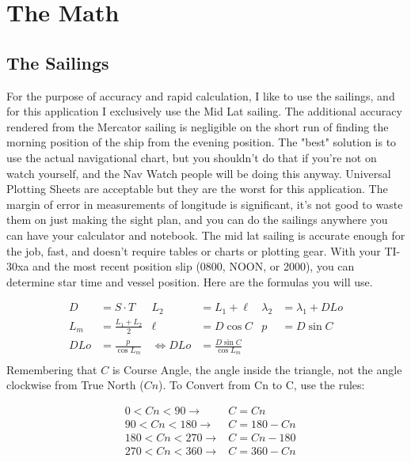 \documentclass{article}
\begin{document}
\section{The Math}\label{sec:examples}

\subsection{The Sailings}

For the purpose of accuracy and rapid calculation, I like to use the sailings, and for this application I exclusively use the Mid Lat sailing. The additional accuracy rendered from the Mercator sailing is negligible on the short run of finding the morning position of the ship from the evening position. The "best" solution is to use the actual navigational chart, but you shouldn't do that if you're not on watch yourself, and the Nav Watch people will be doing this anyway. Universal Plotting Sheets are acceptable but they are the worst for this application. The margin of error in measurements of longitude is significant, it's not good to waste them on just making the sight plan, and you can do the sailings anywhere you can have your calculator and notebook. The mid lat sailing is accurate enough for the job, fast, and doesn't require tables or charts or plotting gear. With your TI-30xa and the most recent position slip (0800, NOON, or 2000), you can determine star time and vessel position. Here are the formulas you will use.

\begin{align*}
    D&=S\cdot T   &   L_2&=L_1+\ell   &   \lambda_2&=\lambda_1+DLo\\
    L_m&=\frac{L_1+L_2}{2}  &   \ell&=D\cos{C}  &   p&=D\sin{C}\\
    DLo&=\frac{p}{\cos{L_m}}    &\Longleftrightarrow     DLo&=\frac{D\sin{C}}{\cos{L_m}}\\
\end{align*}
Remembering that $C$ is Course Angle, the angle inside the triangle, not the angle clockwise from True North ($Cn$). To Convert from Cn to C, use the rules:

\begin{align*}
    &0<Cn<90 \to &C=Cn\\ &90<Cn<180 \to &C=180-Cn\\ &180<Cn<270 \to &C=Cn-180\\ &270<Cn<360 \to &C=360-Cn 
\end{align*}
\end{document}
